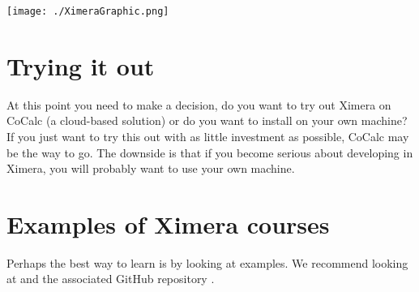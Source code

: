\documentclass{ximera}
\begin{document}
\begin{image}
\texttt{[image: ./XimeraGraphic.png]}
\end{image}

\section{Trying it out}

At this point you need to make a decision, do you want to try out
Ximera on CoCalc (a cloud-based solution) or do you want to install
on your own machine?  If you just want to try this out with as little
investment as possible, CoCalc may be the way to go. The downside is
that if you become serious about developing in Ximera, you will
probably want to use your own machine.

\section{Examples of Ximera courses}

Perhaps the best way to learn is by looking at examples. We recommend
looking at  and the
associated GitHub repository .
\end{document}
